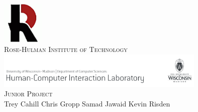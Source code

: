 \documentclass{article}
\begin{document}
\begin{titlepage}
\begin{center}
\includegraphics[width=0.15\textwidth]{../images/rh}\\[1.0cm]
\textsc{\large Rose-Hulman Institute of Technology}\\[1.5cm]
\includegraphics[width=0.75\textwidth]{../images/pss}\\[1.0cm]
\textsc{\large Junior Project}\\[1.0cm]
\large Trey Cahill \hspace{0.2cm} Chris Gropp \hspace{0.2cm} Samad Jawaid \hspace{0.2cm} Kevin Risden
\end{center}
\end{titlepage}
\end{document}
